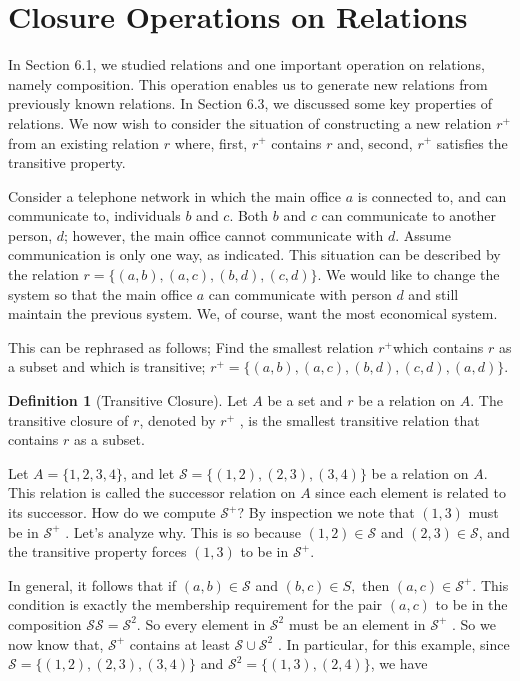 \documentclass[10pt,]{book}
\theoremstyle{plain}
\theoremstyle{definition}
\newtheorem{definition}[theorem]{Definition}
\theoremstyle{definition}
\theoremstyle{definition}
\theoremstyle{definition}
\begin{document}
\section[Closure Operations on Relations]{Closure Operations on Relations}\label{s-closure-operations-on-relations}
In Section 6.1, we studied relations and one important operation on relations, namely composition. This operation enables us to generate new relations from previously known relations. In Section 6.3, we discussed some key properties of relations. We now wish to consider the situation of constructing a new relation \(r^+\) from an existing relation \(r\) where, first, \(r^+\) contains \(r\) and, second, \(r^{+ }\) satisfies the transitive property.%
\par
Consider a telephone network in which the main office \(a\) is connected to, and can communicate to, individuals \(b\) and \(c\).  Both \(b\) and \(c\) can communicate to another person, \(d\); however, the main office cannot communicate with \(d\). Assume communication is only one way, as indicated. This situation can be described by the relation \(r = \{(a, b), (a, c), (b, d), (c, d)\}\). We would like to change the system so that the main office \(a\) can communicate with person \(d\) and still maintain the previous system. We, of course, want the most economical system.%
\par
This can be rephrased as follows; Find the smallest relation \(r^{+ }\)which contains \(r\) as a subset and which is transitive; \(r^+ =\{(a, b), (a, c), (b, d), (c, d), (a, d)\}\).%
\begin{definition}[Transitive Closure]\label{def-transitive-closure}
\label{notation-6}
Let \(A\) be a set and \(r\) be a relation on \(A\). The transitive closure of \(r\), denoted by \(r^+\) , is the smallest transitive relation that contains \(r\) as a subset.%
\end{definition}
\par
Let \(A = \{1, 2, 3, 4\}\), and let \(\mathcal{S} = \{(1, 2), (2, 3), (3, 4)\}\) be a relation on \(A\). This relation is called the successor relation on \(A\) since each element is related to its successor. How do we compute \(\mathcal{S}^+\)?  By inspection we note that \((1, 3)\) must be in \(\mathcal{S}^+\) . Let's analyze why. This is so because \((1,2) \in \mathcal{S}\) and \((2, 3) \in \mathcal{S}\), and the transitive property forces \((1,3)\) to be in \(\mathcal{S}^+\). %
\par
In general, it follows that if \((a, b) \in \mathcal{S}\) and \((b, c) \in S,\) then \((a, c) \in \mathcal{S}^+ \). This condition is exactly the membership requirement for the pair \((a, c)\) to be in the composition \(\mathcal{S}\mathcal{S} = \mathcal{S}^2\). So every element in \(\mathcal{S}^2\) must be an element in \(\mathcal{S}^+\) . So we now know that, \(\mathcal{S}^+\) contains at least \(\mathcal{S} \cup  \mathcal{S}^2\) . In particular, for this example, since \(\mathcal{S} = \{(1, 2), (2, 3), (3, 4)\}\) and \(\mathcal{S}^2 = \{(1, 3), (2, 4)\}\), we have 
\end{document}
